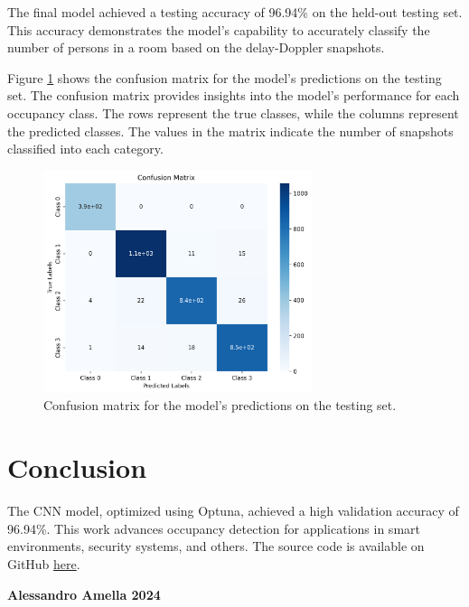 \documentclass{article}
\begin{document}
The final model achieved a testing accuracy of 96.94\% on the held-out testing set. This accuracy demonstrates the model's capability to accurately classify the number of persons in a room based on the delay-Doppler snapshots.

Figure \ref{fig:confusion_matrix} shows the confusion matrix for the model's predictions on the testing set. The confusion matrix provides insights into the model's performance for each occupancy class. The rows represent the true classes, while the columns represent the predicted classes. The values in the matrix indicate the number of snapshots classified into each category.

\begin{figure}
    \centering
    \includegraphics[width=0.7\textwidth]{confusion_matrix.png}
    \caption{Confusion matrix for the model's predictions on the testing set.}
    \label{fig:confusion_matrix}
\end{figure}

\section{Conclusion}
The CNN model, optimized using Optuna, achieved a high validation accuracy of 96.94\%. This work advances occupancy detection for applications in smart environments, security systems, and others. The source code is available on GitHub \textcolor{blue}{\href{https://github.com/Bitrey/MLBrno/blob/master/Project/Project.ipynb}{here}}.

\vspace*{\fill}

\vspace{2em}
\hrulefill
\vspace{1em}

\textbf{Alessandro Amella \textcopyright{} 2024}
\end{document}
